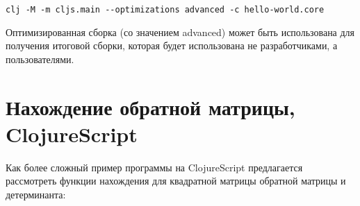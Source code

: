 \begin{center}
	\captionsetup{justification=raggedright,singlelinecheck=off}
	\begin{lstlisting}[label=lst:clojurehelloworld-3,caption=Получение оптимизированной сборки]
clj -M -m cljs.main --optimizations advanced -c hello-world.core
	\end{lstlisting}
\end{center}

Оптимизированная сборка (со значением advanced) может быть использована для получения итоговой сборки, которая будет использована не разработчиками, а пользователями.

\section*{Нахождение обратной матрицы, ClojureScript}

Как более сложный пример программы на ClojureScript предлагается рассмотреть функции нахождения для квадратной матрицы обратной матрицы и детерминанта: 


